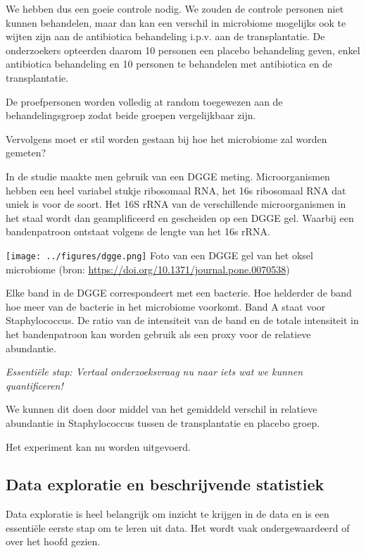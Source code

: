 \documentclass[
  12pt,dutch,coursenotes]{book}
\theoremstyle{definition}
\theoremstyle{definition}
\theoremstyle{definition}
\theoremstyle{remark}
\begin{document}
We hebben dus een goeie controle nodig.
We zouden de controle personen niet kunnen behandelen, maar dan kan een verschil in microbiome mogelijks ook te wijten zijn aan de antibiotica behandeling i.p.v. aan de transplantatie.
De onderzoekers opteerden daarom 10 personen een placebo behandeling geven, enkel antibiotica behandeling en 10 personen te behandelen met antibiotica en de transplantatie.

De proefpersonen worden volledig at random toegewezen aan de behandelingsgroep zodat beide groepen vergelijkbaar zijn.

Vervolgens moet er stil worden gestaan bij hoe het microbiome zal worden gemeten?

In de studie maakte men gebruik van een DGGE meting.
Microorganismen hebben een heel variabel stukje ribosomaal RNA, het 16s ribosomaal RNA dat uniek is voor de soort.
Het 16S rRNA van de verschillende microorganismen in het staal wordt dan geamplificeerd en gescheiden op een DGGE gel.
Waarbij een bandenpatroon ontstaat volgens de lengte van het 16s rRNA.

\texttt{[image: ../figures/dgge.png]}
Foto van een DGGE gel van het oksel microbiome (bron: \url{https://doi.org/10.1371/journal.pone.0070538})

Elke band in de DGGE correspondeert met een bacterie.
Hoe helderder de band hoe meer van de bacterie in het microbiome voorkomt.
Band A staat voor Staphylococcus.
De ratio van de intensiteit van de band en de totale intensiteit in het bandenpatroon kan worden gebruik als een proxy voor de relatieve abundantie.

\emph{Essentiële stap: Vertaal onderzoeksvraag nu naar iets wat we kunnen quantificeren!}

We kunnen dit doen door middel van het gemiddeld verschil in relatieve abundantie in Staphylococcus tussen de transplantatie en placebo groep.

Het experiment kan nu worden uitgevoerd.

\hypertarget{data-exploratie-en-beschrijvende-statistiek}{%
\subsection{Data exploratie en beschrijvende statistiek}\label{data-exploratie-en-beschrijvende-statistiek}}

Data exploratie is heel belangrijk om inzicht te krijgen in de data en is een essentiële eerste stap om te leren uit data.
Het wordt vaak ondergewaardeerd of over het hoofd gezien.
\end{document}
